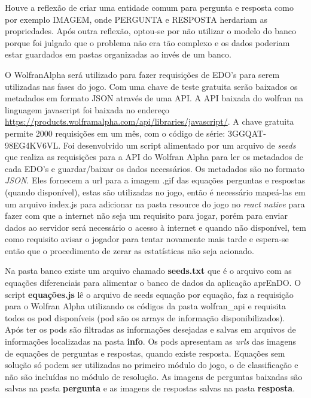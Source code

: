 Houve a reflexão de criar uma entidade comum para pergunta e resposta como por exemplo IMAGEM, onde PERGUNTA e RESPOSTA herdariam as propriedades. Após outra reflexão, optou-se por não utilizar o modelo do banco porque foi julgado que o problema não era tão complexo e os dados poderiam estar guardados em pastas organizadas ao invés de um banco.

O WolfranAlpha será utilizado para fazer requisições de EDO's para serem utilizadas nas fases do jogo. Com uma chave de teste gratuita serão baixados os metadados em formato JSON através de uma API.
A API baixada do wolfran na linguagem javascript foi baixada no endereço \url{https://products.wolframalpha.com/api/libraries/javascript/}.
A chave gratuita permite 2000 requisições em um mês, com o código de série: 3GGQAT-98EG4KV6VL. Foi desenvolvido um script alimentado por um arquivo de \textit{seeds} que realiza as requisições para a API do Wolfran Alpha para ler os metadados de cada EDO's e guardar/baixar os dados necessários. Os metadados são no formato \textit{JSON}. Eles fornecem a url para a imagem .gif das equações perguntas e respostas (quando disponível), estas são utilizadas no jogo, então é necessário mapeá-las em um arquivo index.js para adicionar na pasta resource do jogo no \textit{react native} para fazer com que a internet não seja um requisito para jogar, porém para enviar dados ao servidor será necessário o acesso à internet e quando não disponível, tem como requisito avisar o jogador para tentar novamente mais tarde e espera-se então que o procedimento de zerar as estatísticas não seja acionado.

Na pasta banco existe um arquivo chamado \textbf{seeds.txt} que é o arquivo com as equações diferenciais para alimentar o banco de dados da aplicação aprEnDO. O script \textbf{equações.js} lê o arquivo de seeds equação por equação, faz a requisição para o Wolfran Alpha utilizando os códigos da pasta wolfran\_api e requisita todos os pod disponíveis (pod são os arrays de informação disponibilizados). Após ter os pods são filtradas as informações desejadas e salvas em arquivos de informações localizadas na pasta \textbf{info}. Os pods apresentam as \textit{urls} das imagens de equações de perguntas e respostas, quando existe resposta. Equações sem solução só podem ser utilizadas no primeiro módulo do jogo, o de classificação e não são incluídas no módulo de resolução. As imagens de perguntas baixadas são salvas na pasta \textbf{pergunta} e as imagens de respostas salvas na pasta \textbf{resposta}.

